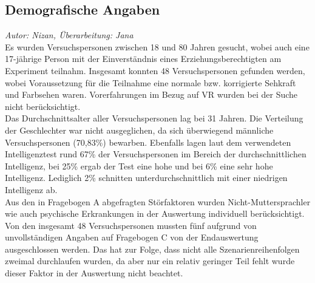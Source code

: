 \documentclass{Bericht}
\begin{document}
\subsection{Demografische Angaben}
\textit{Autor: Nizan, Überarbeitung: Jana}\\
Es wurden Versuchspersonen zwischen 18 und 80 Jahren gesucht, wobei auch eine 17-jährige Person mit der Einverständnis eines Erziehungsberechtigten am Experiment teilnahm. Insgesamt konnten 48 Versuchspersonen gefunden werden, wobei Voraussetzung für die Teilnahme eine normale bzw. korrigierte Sehkraft und Farbsehen waren. Vorerfahrungen im Bezug auf VR wurden bei der Suche nicht berücksichtigt.\\
Das Durchschnittsalter aller Versuchspersonen lag bei 31 Jahren.
Die Verteilung der Geschlechter war nicht ausgeglichen, da sich überwiegend männliche Versuchspersonen (70,83\%) bewarben. Ebenfalls lagen laut dem verwendeten Intelligenztest rund 67\% der Versuchspersonen im Bereich der durchschnittlichen Intelligenz, bei 25\% ergab der Test eine hohe und bei 6\% eine sehr hohe Intelligenz. Lediglich 2\% schnitten unterdurchschnittlich mit einer niedrigen Intelligenz ab.\\
Aus den in Fragebogen A abgefragten Störfaktoren wurden Nicht-Muttersprachler wie auch psychische Erkrankungen in der Auswertung individuell berücksichtigt. 
Von den insgesamt 48 Versuchspersonen mussten fünf aufgrund von unvollständigen Angaben auf Fragebogen C von der Endauswertung ausgeschlossen werden. Das hat zur Folge, dass nicht alle Szenarienreihenfolgen zweimal durchlaufen wurden, da aber nur ein relativ geringer Teil fehlt wurde dieser Faktor in der Auswertung nicht beachtet.
\end{document}
